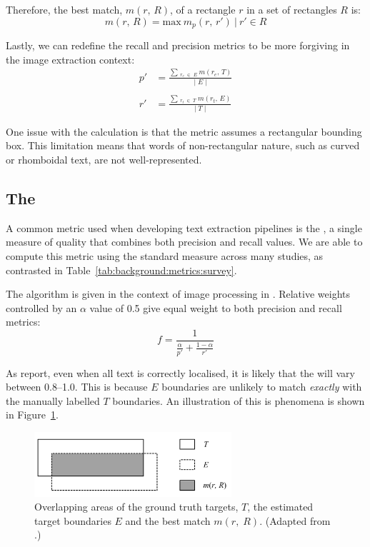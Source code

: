 Therefore, the best match, $m(r,\,R)$, of a rectangle $r$ in a set of rectangles $R$ is:
\begin{equation*}
  m(r,\,R) = \mathrm{max}~m_{p}(r,\,r')~|~r' \in R
\end{equation*}

Lastly, we can redefine the recall and precision metrics to be more forgiving in the image extraction context:
\begin{align*}
  p' &= \frac{\sum\,_{r_{e}\;\in\;E}~m(r_{e},\,T)}{\lvert\;E\;\rvert}\\ \\
  r' &= \frac{\sum\,_{r_{t}\;\in\;T}~m(r_{t},\,E)}{\lvert\;T\;\rvert}
\end{align*}

One issue with the calculation is that the metric assumes a rectangular bounding box. This limitation means that words of non-rectangular nature, such as curved or rhomboidal text, are not well-represented.

\subsection{The \fscore}
\label{sec:background:metrics:fscore}

A common metric used when developing text extraction pipelines is the \fscore, a single measure of quality that combines both precision and recall values. We are able to compute this metric using the standard measure across many studies, as contrasted in Table~\ref{tab:background:metrics:survey}.

The \fscore{} algorithm is given in the context of image processing in \citet{Lucas:2003iw}. Relative weights controlled by an $\alpha$ value of 0.5 give equal weight to both precision and recall metrics:
\begin{equation*}
  f = \frac{1}{\frac{\alpha}{p'} + \frac{1-\alpha}{r'}}
\end{equation*}

As \citet{Chen:2011ul} report, even when all text is correctly localised, it is likely that the \fscore{} will vary between 0.8--1.0. This is because $E$ boundaries are unlikely to match \textit{exactly} with the manually labelled $T$ boundaries. An illustration of this is phenomena is shown in Figure~\ref{fig:background:metrics:ye2005_overlapping}.

\begin{figure}[p]
  \centering
  \includegraphics[width=0.65\textwidth]{images/background/ye2005_overlapping}
  \caption[Overlapping areas of ground truth and estimated targets]{Overlapping areas of the ground truth targets, $T$, the estimated target boundaries $E$ and the best match $m(r,\;R)$. (Adapted from \citep{Ye:2005wu}.)}
  \label{fig:background:metrics:ye2005_overlapping}
\end{figure}

